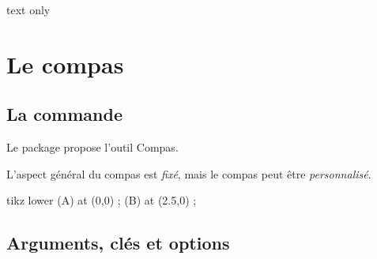 \documentclass[french,a4paper,11pt]{article}
\newcommand\affichegrille[4]{%
	\draw[xstep=1,ystep=1,lightgray] (#1,#3) grid (#2,#4) ;
	\foreach \x in {#1,\inteval{1+#1},...,#2} {\draw[lightgray] (\x,#4)--++(0,3pt) node[font=\scriptsize,above] {$\x$} ;}
	\foreach \y in {#3,\inteval{1+#3},...,#4} {\draw[lightgray] (#1,\y)--++(-3pt,0) node[font=\scriptsize,left] {$\y$} ;}
}
\newcommand\pointsutiles[1]{%
	\foreach \point in {#1} {\draw[thick,fill=red] \point circle[radius=3pt] ;}
}
\begin{document}
\begin{PresentationCode}{text only}
\end{PresentationCode}

\pagebreak

\section{Le compas}

\subsection{La commande}

\begin{cautionblock}
Le package propose l'outil \textsf{Compas}.

L'aspect général du compas est \textit{fixé}, mais le compas peut être \textit{personnalisé}.
\end{cautionblock}

\begin{PresentationCode}{tikz lower}
\coordinate (A) at (0,0) ;
\coordinate (B) at (2.5,0) ;
\end{PresentationCode}

\subsection{Arguments, clés et options}
\end{document}
